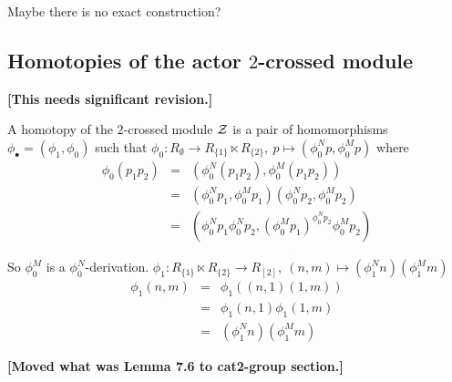Maybe there is no exact construction?

\vspace*{10mm}


\subsection{Homotopies of the actor $2$-crossed module}

{\bf [This needs significant revision.]}

\begin{defn}
A homotopy of the $2$-crossed module $\mathcal{Z}$
is a pair of homomorphisms $\phi_{\bullet} = (\phi_1,\phi_0)$
such that 
$\phi_0: R_{\emptyset} \to R_{\{1\}} \ltimes R_{\{2\}}, \ 
 p \mapsto(\phi_0^{N}p, \phi_0^{M}p)$ where
\begin{eqnarray*}
\phi_0(p_1p_2) 
  & = &  (\phi_0^{N}(p_1p_2), \phi_0^{M}(p_1p_2)) \\
  & = &  (\phi_0^{N}p_1, \phi_0^{M}p_1)(\phi_0^{N}p_2, \phi_0^{M}p_2) \\
  & = &  (\phi_0^{N}p_1 \phi_0^{N}p_2, 
          (\phi_0^{M}p_1)^{\phi_0^{N}p_2} \phi_0^{M}p_2)
\end{eqnarray*}
\end{defn}

So $\phi_0^{M}$ is a $\phi_0^{N}$-derivation.
$\phi_1:  R_{\{1\}} \ltimes R_{\{2\}} \to R_{[2]}, \ 
 (n, m) \mapsto (\phi_1^{N}n)( \phi_1^{M}m)$
\begin{eqnarray*}
\phi_1(n,m) & = & \phi_1((n,1)(1, m)) \\
                       & = & \phi_1(n,1) \phi_1(1,m) \\
                       & = & (\phi_1^{N}n)( \phi_1^{M}m)
\end{eqnarray*}
      
\bigskip\noindent
{\bf [Moved what was Lemma 7.6 to cat2-group section.]}

